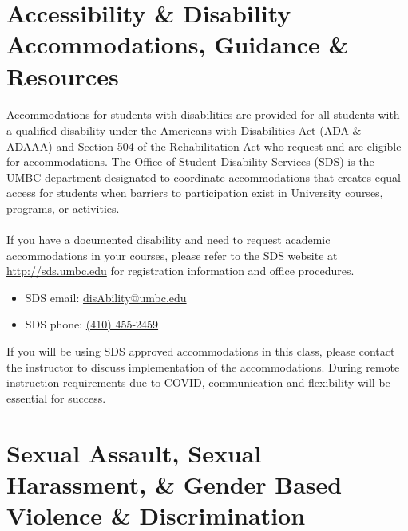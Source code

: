 \documentclass[letter,10pt]{article}
\begin{document}

\section*{Accessibility \& Disability Accommodations, Guidance \& Resources}
\paragraph{}Accommodations for students with disabilities are provided for all students with a qualified disability under the Americans with Disabilities Act (ADA \& ADAAA) and Section 504 of the Rehabilitation Act who request and are eligible for accommodations. The Office of Student Disability Services (SDS) is the UMBC department designated to coordinate accommodations that creates equal access for students when barriers to participation exist in University courses, programs, or activities.

\paragraph{}If you have a documented disability and need to request academic accommodations in your courses, please refer to the SDS website at \url{http://sds.umbc.edu} for registration information and office procedures.
\begin{itemize}
\item SDS email: \href{mailto:disAbility@umbc.edu}{disAbility@umbc.edu}
\item SDS phone: \href{tel:+14104552459}{(410) 455-2459}
\end{itemize}
If you will be using SDS approved accommodations in this class, please contact the instructor to discuss implementation of the accommodations. During remote instruction requirements due to COVID, communication and flexibility will be essential for success.

\section*{Sexual Assault, Sexual Harassment, \& Gender Based Violence \& Discrimination}
\end{document}
